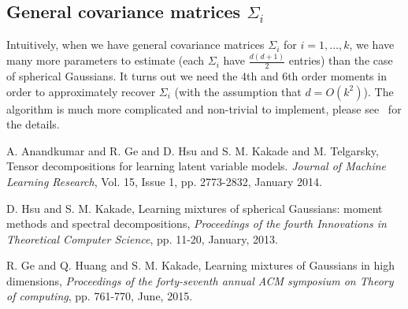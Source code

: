 \documentclass{article}
\begin{document}
\subsection{General covariance matrices $\Sigma_i$}
Intuitively, when we have general covariance matrices $\Sigma_i$ for $i=1,\ldots,k$, we have many more parameters to estimate (each $\Sigma_i$ have $\frac{d(d+1)}{2}$ entries) than the case of spherical Gaussians. It turns out we need the $4$th and $6$th order moments in order to approximately recover $\Sigma_i$ (with the assumption that $d=O(k^2)$). The algorithm is much more complicated and non-trivial to implement, please see~\cite{GeHK2015} for the details.

\begin{thebibliography}{6}

A. Anandkumar and R. Ge and D. Hsu and S. M. Kakade and M. Telgarsky, Tensor decompositions for learning latent variable models. \textit{Journal of Machine Learning Research}, Vol. 15, Issue 1, pp. 2773-2832, January 2014.

 D. Hsu and S. M. Kakade, Learning mixtures of spherical Gaussians: moment methods and spectral decompositions, \textit{Proceedings of the fourth Innovations in Theoretical Computer Science}, pp. 11-20, January, 2013.

 R. Ge and Q. Huang and S. M. Kakade, Learning mixtures of Gaussians in high dimensions, \textit{Proceedings of the forty-seventh annual ACM symposium on Theory of computing}, pp. 761-770, June, 2015.

\end{thebibliography}
\end{document}
